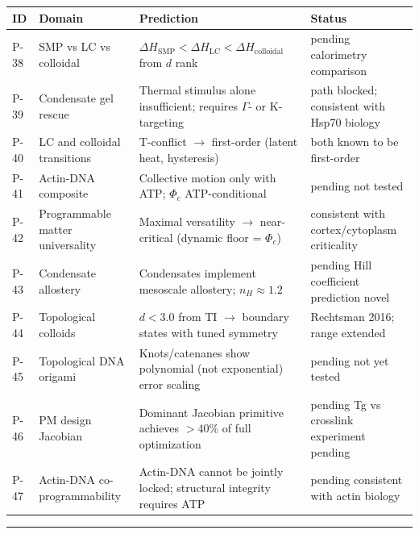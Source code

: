 \documentclass[12pt,a4paper]{article}
\begin{document}
\begin{table}[htbp]
\centering
\small
{}
\begin{tabularx}{\textwidth}{>{\centering\arraybackslash}X >{\centering\arraybackslash}X >{\centering\arraybackslash}X >{\centering\arraybackslash}X}
\toprule
\rowcolor{gray!25}\textbf{ID} & \textbf{Domain} & \textbf{Prediction} & \textbf{Status} \\
\midrule
\rowcolors{1}{white}{gray!10}
P-38 & SMP vs LC vs colloidal & $\Delta H_\text{SMP} < \Delta H_\text{LC} < \Delta H_\text{colloidal}$ from $d$ rank & pending calorimetry comparison \\
P-39 & Condensate gel rescue & Thermal stimulus alone insufficient; requires $\Gamma$- or K-targeting &  path blocked; consistent with Hsp70 biology \\
P-40 & LC and colloidal transitions & T-conflict $\rightarrow$ first-order (latent heat, hysteresis) &  both known to be first-order \\
P-41 & Actin-DNA composite & Collective motion only with ATP; $\Phi_c$ ATP-conditional & pending not tested \\
P-42 & Programmable matter universality & Maximal versatility $\rightarrow$ near-critical (dynamic floor = $\Phi_c$) &  consistent with cortex/cytoplasm criticality \\
P-43 & Condensate allostery & Condensates implement mesoscale allostery; $n_H \approx 1.2$ & pending Hill coefficient prediction novel \\
P-44 & Topological colloids & $d < 3.0$ from TI $\rightarrow$ boundary states with tuned symmetry &  Rechtsman 2016; range extended \\
P-45 & Topological DNA origami & Knots/catenanes show polynomial (not exponential) error scaling & pending not yet tested \\
P-46 & PM design Jacobian & Dominant Jacobian primitive achieves $> 40\%$ of full optimization & pending Tg vs crosslink experiment pending \\
P-47 & Actin-DNA co-programmability & Actin-DNA cannot be jointly locked; structural integrity requires ATP & pending consistent with actin biology \\
\bottomrule
\end{tabularx}
\end{table}

\begin{center}
\rule{0.5\textwidth}{0.4pt}
\end{center}
\end{document}
